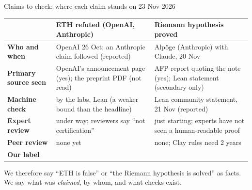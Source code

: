 \begin{frame}{Claims to check: where each claim stands on 23 Nov 2026}
\begin{sfig}[0.78]
\begin{tabular}{@{}L{34mm}L{50mm}L{50mm}@{}}
\toprule
 & \textbf{ETH refuted (OpenAI, Anthropic)} & \textbf{Riemann hypothesis proved}\\\midrule
\textbf{Who and when} & OpenAI 26 Oct; an Anthropic claim followed (reported) & Alp\"oge (Anthropic) with Claude, 20 Nov\\
\textbf{Primary source seen} & OpenAI's announcement page (yes); the preprint PDF (not read) & AFP report quoting the note (yes); Lean statement (secondary only)\\
\textbf{Machine check} & by the labs, Lean (a weaker bound than the headline) & Lean community statement, 21 Nov (reported)\\
\textbf{Expert review} & under way; reviewers say ``not certification'' & just starting; experts have not seen a human-readable proof\\
\textbf{Peer review} & none yet & none; Clay rules need 2 years\\
\textbf{Our label} &  & \\\bottomrule
\end{tabular}
\end{sfig}
\vspace{2mm}
{\small We therefore  say ``ETH is false'' or ``the Riemann hypothesis is solved'' as facts. We say what was \emph{claimed}, by whom, and what checks exist.}
\end{frame}

